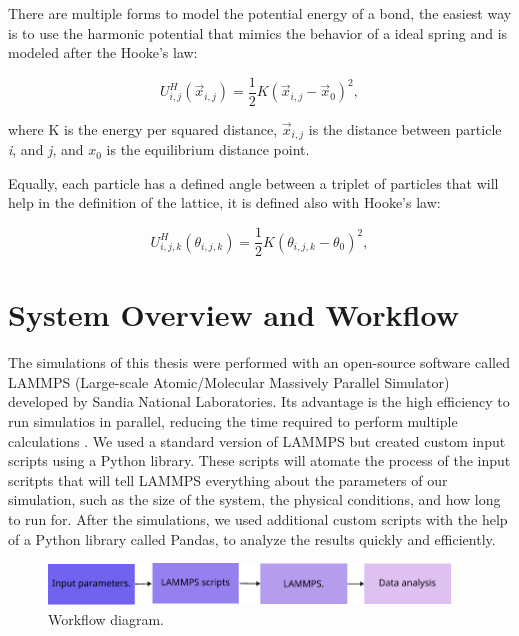 There are multiple forms to model the potential energy of a bond, the easiest way is to use the harmonic potential that mimics the behavior of a ideal spring and is modeled after the Hooke's law:

\begin{equation}
  U^{H}_{i,j}(\vec{x}_{i,j}) = \frac{1}{2}K(\vec{x}_{i,j} - \vec{x}_0)^2,
\end{equation}

where K is the energy per squared distance, $\vec{x}_{i,j}$ is the distance between particle \textit{i}, and \textit{j}, and $x_0$ is the equilibrium distance point.

Equally, each particle has a defined angle between a triplet of particles that will help in the definition of the lattice, it is defined also with Hooke's law:

\begin{equation}
  U^{H}_{i,j,k}(\theta _{i,j,k}) = \frac{1}{2}K(\theta_{i,j,k} - \theta_0)^2,
\end{equation}



\section{System Overview and Workflow}

The simulations of this thesis were performed with an open-source software called LAMMPS (Large-scale Atomic/Molecular Massively Parallel Simulator) developed by Sandia National Laboratories. Its advantage is the high efficiency to run simulatios in parallel, reducing the time required to perform multiple calculations \cite{LAMMPS}. We used a standard version of LAMMPS but created custom input scripts using a Python library. These scripts will atomate the process of the input scritpts that will tell LAMMPS everything about the parameters of our simulation, such as the size of the system, the physical conditions, and how long to run for. After the simulations, we used additional custom scripts with the help of a Python library called Pandas, to analyze the results quickly and efficiently.

\begin{figure}[h]
  \begin{center}
    \includegraphics[width=0.95\textwidth]{figures/workflow.pdf}
  \end{center}
  \caption[Workflow diagram.]{Workflow diagram.}\label{fig:workflow}
\end{figure}

